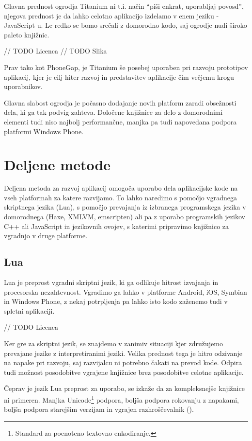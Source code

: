 Glavna prednost ogrodja Titanium ni t.i. način ``piši enkrat, uporabljaj povosd'', njegova prednost je da lahko celotno aplikacijo izdelamo v enem jeziku - JavaScript-u. Le redko se bomo srečali z domorodno kodo, saj ogrodje nudi široko paleto knjižnic.

// TODO Licenca
// TODO Slika

Prav tako kot PhoneGap, je Titanium še posebej uporaben pri razvoju prototipov aplikacij, kjer je cilj hiter razvoj in predstavitev aplikacije čim večjemu krogu uporabnikov.

Glavna slabost ogrodja je počasno dodajanje novih platform zaradi obsežnosti dela, ki ga tak podvig zahteva. Določene knjižnice za delo z domorodnimi elementi tudi niso najbolj performančne, manjka pa tudi napovedana podpora platformi Windows Phone.

\section{Deljene metode}

Deljena metoda za razvoj aplikacij omogoča uporabo dela aplikacijske kode na vseh platformah za katere razvijamo. To lahko naredimo s pomočjo vgradnega skriptnega jezika (Lua), s pomočjo prevajanja iz izbranega programskega jezika v domorodnega (Haxe, XMLVM, emscripten) ali pa z uporabo programskih jezikov C++ ali JavaScript in jezikovnih ovojev, s katerimi pripravimo knjižnico za vgradnjo v druge platforme.

\subsection{Lua}

Lua\cite{lua} je preprost vgradni skriptni jezik, ki ga odlikuje hitrost izvajanja in procesorska nezahtevnost. Vgradimo ga lahko v platforme Android, iOS, Symbian in Windows Phone, z nekaj potrpljenja pa lahko isto kodo zaženemo tudi v spletni aplikaciji.

// TODO Licenca

Ker gre za skriptni jezik, se znajdemo v zanimiv situaciji kjer združujemo prevajane jezike z interpretiranimi jeziki. Velika prednost tega je hitro odzivanje na napake pri razvoju, saj razvijalcu ni potrebno čakati na prevod kode. Odpira tudi možnost posodobitve vgrajene knjižnice brez posodobitve celotne aplikacije.

Čeprav je jezik Lua preprost za uporabo, se izkaže da za kompleksnejše knjižnice ni primeren. Manjka Unicode\footnote{Standard za poenoteno textovno enkodiranje.} podpora, boljša podpora rokovanju z napakami, boljša podpora starejšim verzijam in vgrajen razhroščevalnik ().

